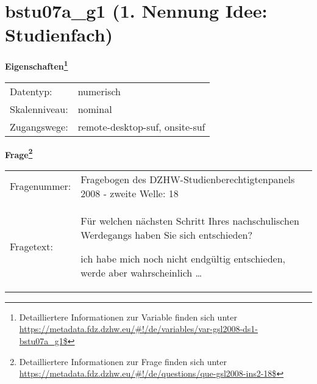 
    \setcounter{footnote}{0}

    \vspace*{-1.8cm}
	\section{bstu07a\_g1 (1. Nennung Idee: Studienfach)}
	\label{section:bstu07a_g1}



    \vspace*{0.5cm}
    \noindent\textbf{Eigenschaften\footnote{Detailliertere Informationen zur Variable finden sich unter
		\url{https://metadata.fdz.dzhw.eu/\#!/de/variables/var-gsl2008-ds1-bstu07a_g1$}}}\\
	\begin{tabularx}{\hsize}{@{}lX}
	Datentyp: & numerisch \\
	Skalenniveau: & nominal \\
	Zugangswege: &
	  remote-desktop-suf, 
	  onsite-suf
 \\
    \end{tabularx}



				\vspace*{0.5cm}
                \noindent\textbf{Frage\footnote{Detailliertere Informationen zur Frage finden sich unter
		              \url{https://metadata.fdz.dzhw.eu/\#!/de/questions/que-gsl2008-ins2-18$}}}\\
				\begin{tabularx}{\hsize}{@{}lX}
					Fragenummer: &
					  Fragebogen des DZHW-Studienberechtigtenpanels 2008 - zweite Welle:
					  18
 \\
					Fragetext: & Für welchen nächsten Schritt Ihres nachschulischen Werdegangs haben Sie sich entschieden?\par  ich habe mich noch nicht endgültig entschieden, werde aber wahrscheinlich … \\
				\end{tabularx}





